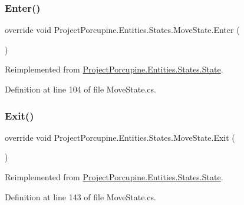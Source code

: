 \subsubsection{\texorpdfstring{Enter()}{Enter()}}
{\footnotesize\ttfamily override void Project\+Porcupine.\+Entities.\+States.\+Move\+State.\+Enter (\begin{DoxyParamCaption}{ }\end{DoxyParamCaption})\hspace{0.3cm}{\ttfamily [virtual]}}



Reimplemented from \hyperlink{class_project_porcupine_1_1_entities_1_1_states_1_1_state_a1e1ee50555cfa4eb75d52876015b54c1}{Project\+Porcupine.\+Entities.\+States.\+State}.



Definition at line 104 of file Move\+State.\+cs.

\mbox{\label{class_project_porcupine_1_1_entities_1_1_states_1_1_move_state_a5b379c83e83f2db29c338f0babc3994e}} 
\subsubsection{\texorpdfstring{Exit()}{Exit()}}
{\footnotesize\ttfamily override void Project\+Porcupine.\+Entities.\+States.\+Move\+State.\+Exit (\begin{DoxyParamCaption}{ }\end{DoxyParamCaption})\hspace{0.3cm}{\ttfamily [virtual]}}



Reimplemented from \hyperlink{class_project_porcupine_1_1_entities_1_1_states_1_1_state_aed1e6db379e98e447596fc72a69eec0c}{Project\+Porcupine.\+Entities.\+States.\+State}.



Definition at line 143 of file Move\+State.\+cs.

\mbox{\label{class_project_porcupine_1_1_entities_1_1_states_1_1_move_state_a875221e1914193146fc96d1fc5a3ac59}} 

